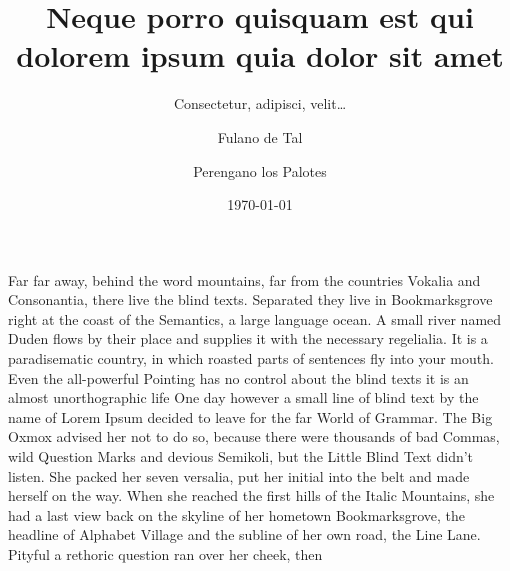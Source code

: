 \documentclass[copyright]{tesisusach}
\title{Neque porro quisquam est qui dolorem ipsum quia dolor sit amet}
\author{Fulano de Tal \and Perengano los Palotes}
\date{\today}
\subtitle{Consectetur, adipisci, velit\ldots}
\begin{document}
	\maketitle
	\frontmatter
	
	\begin{resumenEs}
		\lipsum[1]	
	\end{resumenEs}
	
	\begin{resumenEn}
		Far far away, behind the word mountains, far from the countries Vokalia and Consonantia, there live the blind texts. Separated they live in Bookmarksgrove right at the coast of the Semantics, a large language ocean. A small river named Duden flows by their place and supplies it with the necessary regelialia. It is a paradisematic country, in which roasted parts of sentences fly into your mouth. Even the all-powerful Pointing has no control about the blind texts it is an almost unorthographic life One day however a small line of blind text by the name of Lorem Ipsum decided to leave for the far World of Grammar. The Big Oxmox advised her not to do so, because there were thousands of bad Commas, wild Question Marks and devious Semikoli, but the Little Blind Text didn’t listen. She packed her seven versalia, put her initial into the belt and made herself on the way. When she reached the first hills of the Italic Mountains, she had a last view back on the skyline of her hometown Bookmarksgrove, the headline of Alphabet Village and the subline of her own road, the Line Lane. Pityful a rethoric question ran over her cheek, then
	\end{resumenEn}

	
	\begin{agradecimiento}
		\lipsum[2-3]
	\end{agradecimiento}

	\tableofcontents
	\newpage
	\listoftables
	\newpage
	\listoffigures
	\newpage

	\mainmatter
	
	
	
	
	\printbibliography[heading=bibintoc]
	
	\appendix
	

	\annex
	
	
	
\end{document}
